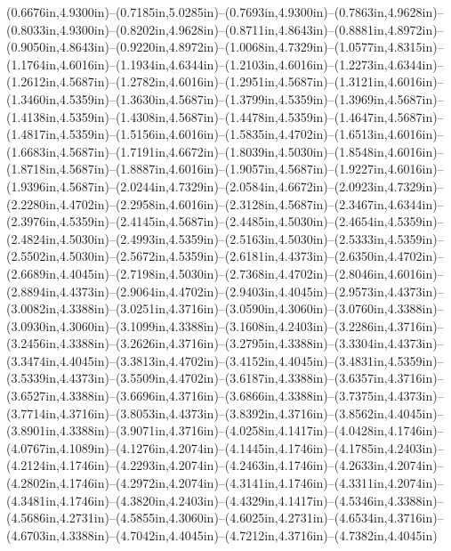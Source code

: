 (0.6676in,4.9300in)--(0.7185in,5.0285in)--(0.7693in,4.9300in)--(0.7863in,4.9628in)--(0.8033in,4.9300in)--(0.8202in,4.9628in)--(0.8711in,4.8643in)--(0.8881in,4.8972in)--(0.9050in,4.8643in)--(0.9220in,4.8972in)--(1.0068in,4.7329in)--(1.0577in,4.8315in)--(1.1764in,4.6016in)--(1.1934in,4.6344in)--(1.2103in,4.6016in)--(1.2273in,4.6344in)--(1.2612in,4.5687in)--(1.2782in,4.6016in)--(1.2951in,4.5687in)--(1.3121in,4.6016in)--(1.3460in,4.5359in)--(1.3630in,4.5687in)--(1.3799in,4.5359in)--(1.3969in,4.5687in)--(1.4138in,4.5359in)--(1.4308in,4.5687in)--(1.4478in,4.5359in)--(1.4647in,4.5687in)--(1.4817in,4.5359in)--(1.5156in,4.6016in)--(1.5835in,4.4702in)--(1.6513in,4.6016in)--(1.6683in,4.5687in)--(1.7191in,4.6672in)--(1.8039in,4.5030in)--(1.8548in,4.6016in)--(1.8718in,4.5687in)--(1.8887in,4.6016in)--(1.9057in,4.5687in)--(1.9227in,4.6016in)--(1.9396in,4.5687in)--(2.0244in,4.7329in)--(2.0584in,4.6672in)--(2.0923in,4.7329in)--(2.2280in,4.4702in)--(2.2958in,4.6016in)--(2.3128in,4.5687in)--(2.3467in,4.6344in)--(2.3976in,4.5359in)--(2.4145in,4.5687in)--(2.4485in,4.5030in)--(2.4654in,4.5359in)--(2.4824in,4.5030in)--(2.4993in,4.5359in)--(2.5163in,4.5030in)--(2.5333in,4.5359in)--(2.5502in,4.5030in)--(2.5672in,4.5359in)--(2.6181in,4.4373in)--(2.6350in,4.4702in)--(2.6689in,4.4045in)--(2.7198in,4.5030in)--(2.7368in,4.4702in)--(2.8046in,4.6016in)--(2.8894in,4.4373in)--(2.9064in,4.4702in)--(2.9403in,4.4045in)--(2.9573in,4.4373in)--(3.0082in,4.3388in)--(3.0251in,4.3716in)--(3.0590in,4.3060in)--(3.0760in,4.3388in)--(3.0930in,4.3060in)--(3.1099in,4.3388in)--(3.1608in,4.2403in)--(3.2286in,4.3716in)--(3.2456in,4.3388in)--(3.2626in,4.3716in)--(3.2795in,4.3388in)--(3.3304in,4.4373in)--(3.3474in,4.4045in)--(3.3813in,4.4702in)--(3.4152in,4.4045in)--(3.4831in,4.5359in)--(3.5339in,4.4373in)--(3.5509in,4.4702in)--(3.6187in,4.3388in)--(3.6357in,4.3716in)--(3.6527in,4.3388in)--(3.6696in,4.3716in)--(3.6866in,4.3388in)--(3.7375in,4.4373in)--(3.7714in,4.3716in)--(3.8053in,4.4373in)--(3.8392in,4.3716in)--(3.8562in,4.4045in)--(3.8901in,4.3388in)--(3.9071in,4.3716in)--(4.0258in,4.1417in)--(4.0428in,4.1746in)--(4.0767in,4.1089in)--(4.1276in,4.2074in)--(4.1445in,4.1746in)--(4.1785in,4.2403in)--(4.2124in,4.1746in)--(4.2293in,4.2074in)--(4.2463in,4.1746in)--(4.2633in,4.2074in)--(4.2802in,4.1746in)--(4.2972in,4.2074in)--(4.3141in,4.1746in)--(4.3311in,4.2074in)--(4.3481in,4.1746in)--(4.3820in,4.2403in)--(4.4329in,4.1417in)--(4.5346in,4.3388in)--(4.5686in,4.2731in)--(4.5855in,4.3060in)--(4.6025in,4.2731in)--(4.6534in,4.3716in)--(4.6703in,4.3388in)--(4.7042in,4.4045in)--(4.7212in,4.3716in)--(4.7382in,4.4045in)
